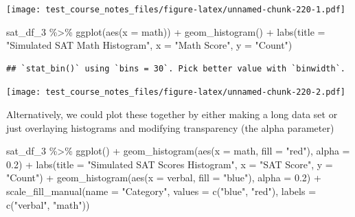 \documentclass[
]{book}
\newenvironment{Shaded}{\begin{snugshade}}{\end{snugshade}}
\newcommand{\AttributeTok}[1]{\textcolor[rgb]{0.77,0.63,0.00}{#1}}
\newcommand{\FloatTok}[1]{\textcolor[rgb]{0.00,0.00,0.81}{#1}}
\newcommand{\FunctionTok}[1]{\textcolor[rgb]{0.00,0.00,0.00}{#1}}
\newcommand{\NormalTok}[1]{#1}
\newcommand{\SpecialCharTok}[1]{\textcolor[rgb]{0.00,0.00,0.00}{#1}}
\newcommand{\StringTok}[1]{\textcolor[rgb]{0.31,0.60,0.02}{#1}}
\begin{document}
\texttt{[image: test\_course\_notes\_files/figure-latex/unnamed-chunk-220-1.pdf]}

\begin{Shaded}
\begin{Highlighting}[]
\NormalTok{sat\_df\_3 }\SpecialCharTok{\%\textgreater{}\%} \FunctionTok{ggplot}\NormalTok{(}\FunctionTok{aes}\NormalTok{(}\AttributeTok{x =}\NormalTok{ math)) }\SpecialCharTok{+}
  \FunctionTok{geom\_histogram}\NormalTok{() }\SpecialCharTok{+}
  \FunctionTok{labs}\NormalTok{(}\AttributeTok{title =} \StringTok{"Simulated SAT Math Histogram"}\NormalTok{,}
       \AttributeTok{x =} \StringTok{"Math Score"}\NormalTok{,}
       \AttributeTok{y =} \StringTok{"Count"}\NormalTok{)}
\end{Highlighting}
\end{Shaded}

\begin{verbatim}
## `stat_bin()` using `bins = 30`. Pick better value with `binwidth`.
\end{verbatim}

\texttt{[image: test\_course\_notes\_files/figure-latex/unnamed-chunk-220-2.pdf]}

Alternatively, we could plot these together by either making a long data set or just overlaying histograms and modifying transparency (the alpha parameter)

\begin{Shaded}
\begin{Highlighting}[]
\NormalTok{sat\_df\_3 }\SpecialCharTok{\%\textgreater{}\%} \FunctionTok{ggplot}\NormalTok{() }\SpecialCharTok{+}
  \FunctionTok{geom\_histogram}\NormalTok{(}\FunctionTok{aes}\NormalTok{(}\AttributeTok{x =}\NormalTok{ math, }\AttributeTok{fill =} \StringTok{"red"}\NormalTok{), }\AttributeTok{alpha =} \FloatTok{0.2}\NormalTok{) }\SpecialCharTok{+}
  \FunctionTok{labs}\NormalTok{(}\AttributeTok{title =} \StringTok{"Simulated SAT Scores Histogram"}\NormalTok{,}
       \AttributeTok{x =} \StringTok{"SAT Score"}\NormalTok{,}
       \AttributeTok{y =} \StringTok{"Count"}\NormalTok{) }\SpecialCharTok{+}
  \FunctionTok{geom\_histogram}\NormalTok{(}\FunctionTok{aes}\NormalTok{(}\AttributeTok{x =}\NormalTok{ verbal, }\AttributeTok{fill =} \StringTok{"blue"}\NormalTok{), }\AttributeTok{alpha =} \FloatTok{0.2}\NormalTok{) }\SpecialCharTok{+}
  \FunctionTok{scale\_fill\_manual}\NormalTok{(}\AttributeTok{name =} \StringTok{"Category"}\NormalTok{, }\AttributeTok{values =} \FunctionTok{c}\NormalTok{(}\StringTok{"blue"}\NormalTok{, }\StringTok{"red"}\NormalTok{), }\AttributeTok{labels =} \FunctionTok{c}\NormalTok{(}\StringTok{"verbal"}\NormalTok{, }\StringTok{"math"}\NormalTok{))}
\end{Highlighting}
\end{Shaded}
\end{document}
